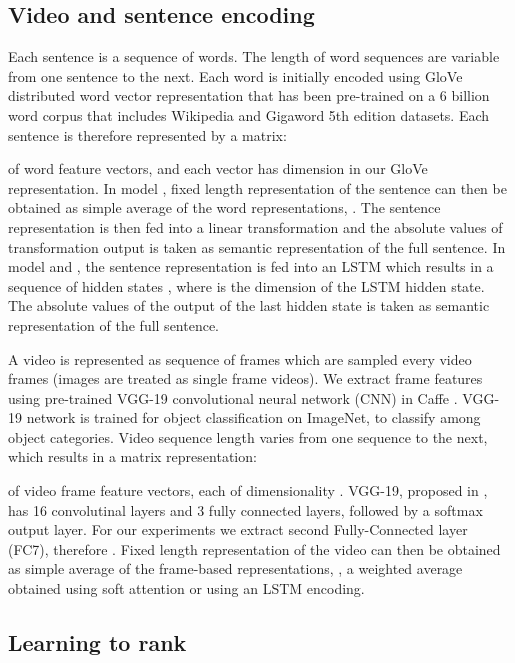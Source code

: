 \documentclass[runningheads]{llncs}
\begin{document}
\subsection{Video and sentence encoding}
\label{input}
 Each sentence is a sequence of words. The length of word sequences are variable from one sentence to the next. Each word is initially encoded using GloVe \cite{pennington2014glove} distributed word vector representation that has been pre-trained on a 6 billion word corpus that includes Wikipedia and Gigaword 5th edition datasets. Each sentence is therefore represented by a matrix:

of  word feature vectors, and each vector has  dimension in our GloVe representation. 
In model , fixed length representation of the sentence can then be obtained as simple average of the word representations, . The sentence representation is then fed into a linear transformation and the absolute values of transformation output is taken as semantic representation of the full sentence. In model  and , the sentence representation  is fed into an LSTM which results in a sequence of hidden states , where  is the dimension of the LSTM hidden state. The absolute values of the output of the last hidden state  is taken as semantic representation of the full sentence.

A video is represented as sequence of frames which are sampled every  video frames (images are treated as single frame videos). We extract frame features using pre-trained VGG-19 \cite{Simonyan14c} convolutional neural network (CNN) in Caffe \cite{jia2014caffe}. VGG-19 network \cite{Simonyan14c} is trained for object classification on ImageNet, to classify among  object categories. Video sequence length varies from one sequence to the next, which results in a matrix  representation:

of  video frame feature vectors, each of dimensionality . VGG-19, proposed in \cite{Simonyan14c}, has 16 convolutinal layers and 3 fully connected layers, followed by a softmax output layer. For our experiments we extract second Fully-Connected layer (FC7), therefore . Fixed length representation of the video can then be obtained as simple average of the frame-based representations, , a weighted average obtained using soft attention or using an LSTM encoding.




\subsection{Learning to rank}
\label{LR}
\end{document}
